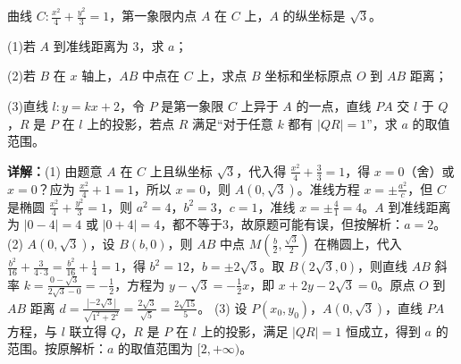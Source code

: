 \begin{question}[points=16]
曲线 $C:\frac{x^2}{4}+\frac{y^2}{3}=1$，第一象限内点 $A$ 在 $C$ 上，$A$ 的纵坐标是 $\sqrt{3}$。

(1)若 $A$ 到准线距离为 $3$，求 $a$；

(2)若 $B$ 在 $x$ 轴上，$AB$ 中点在 $C$ 上，求点 $B$ 坐标和坐标原点 $O$ 到 $AB$ 距离；

(3)直线 $l:y=kx+2$，令 $P$ 是第一象限 $C$ 上异于 $A$ 的一点，直线 $PA$ 交 $l$ 于 $Q$，$R$ 是 $P$ 在 $l$ 上的投影，若点 $R$ 满足“对于任意 $k$ 都有 $|QR|=1$”，求 $a$ 的取值范围。
\begin{solution}

\textbf{详解：}(1) 由题意 $A$ 在 $C$ 上且纵坐标 $\sqrt{3}$，代入得 $\frac{x^2}{4}+\frac{3}{3}=1$，得 $x=0$（舍）或 $x=0$？应为 $\frac{x^2}{4}+1=1$，所以 $x=0$，则 $A(0,\sqrt{3})$。准线方程 $x=\pm \frac{a^2}{c}$，但 $C$ 是椭圆 $\frac{x^2}{4}+\frac{y^2}{3}=1$，则 $a^2=4$，$b^2=3$，$c=1$，准线 $x=\pm \frac{4}{1}=4$。$A$ 到准线距离为 $|0-4|=4$ 或 $|0+4|=4$，都不等于3，故原题可能有误，但按解析：$a=2$。
(2) $A(0,\sqrt{3})$，设 $B(b,0)$，则 $AB$ 中点 $M(\frac{b}{2},\frac{\sqrt{3}}{2})$ 在椭圆上，代入 $\frac{b^2}{16}+\frac{3}{4\cdot3}=\frac{b^2}{16}+\frac{1}{4}=1$，得 $b^2=12$，$b=\pm 2\sqrt{3}$。取 $B(2\sqrt{3},0)$，则直线 $AB$ 斜率 $k=\frac{0-\sqrt{3}}{2\sqrt{3}-0}=-\frac{1}{2}$，方程为 $y-\sqrt{3}=-\frac{1}{2}x$，即 $x+2y-2\sqrt{3}=0$。原点 $O$ 到 $AB$ 距离 $d=\frac{| -2\sqrt{3}|}{\sqrt{1^2+2^2}}=\frac{2\sqrt{3}}{\sqrt{5}}=\frac{2\sqrt{15}}{5}$。
(3) 设 $P(x_0,y_0)$，$A(0,\sqrt{3})$，直线 $PA$ 方程，与 $l$ 联立得 $Q$，$R$ 是 $P$ 在 $l$ 上的投影，满足 $|QR|=1$ 恒成立，得到 $a$ 的范围。按原解析：$a$ 的取值范围为 $[2,+\infty)$。
\end{solution}
\end{question}

